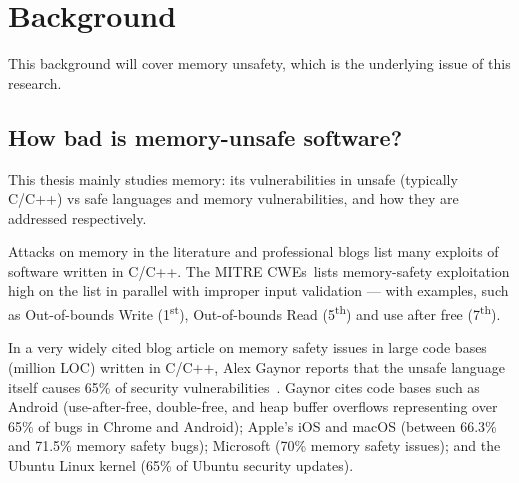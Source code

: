 \documentclass[nomenclature, english, bibtex]{kththesis}
\newcommand*{\generalExpl}[1]{\todo[inline]{#1}}
\begin{document}
\section{Background}
\label{sec:background}
This background will cover memory unsafety, which is the underlying issue of this research.


\subsection{How bad is memory-unsafe software?}
\label{sec:sizeOfProblem}



This thesis mainly studies memory: its vulnerabilities in unsafe (typically C/C++) vs safe languages and memory vulnerabilities, and how they are addressed respectively.  

Attacks on memory in the literature and professional blogs list many exploits of software written in C/C++. The MITRE \glspl{CWE}\,\cite{noauthor_cwe_nodate} lists \gls{memory-safety} exploitation high on the list in parallel with improper input validation --- with examples, such as Out-of-bounds Write (1\textsuperscript{st}), Out-of-bounds Read (5\textsuperscript{th}) and use after free (7\textsuperscript{th}).

In a very widely cited blog article on memory safety issues in large code bases (million \gls{LOC}) written in C/C++, Alex Gaynor reports that the unsafe language itself causes 65\% of security vulnerabilities \,\cite{gaynor_what_2020}. Gaynor cites code bases such as Android (use-after-free, double-free, and heap buffer overflows representing over 65\% of bugs in Chrome and Android); Apple's iOS and macOS (between 66.3\% and 71.5\% memory safety bugs); Microsoft (70\%  memory safety issues); and the Ubuntu Linux kernel (65\% of Ubuntu security updates).
\end{document}

